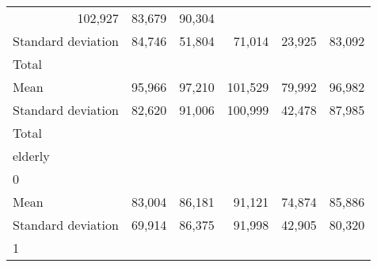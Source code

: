 \begin{tabular}{llllll}
  \multicolumn{1}{r}{102,927} &
  \multicolumn{1}{r}{83,679} &
  \multicolumn{1}{r}{90,304} \\
\multicolumn{1}{l}{\hspace{4em}Standard deviation} &
  \multicolumn{1}{|r}{84,746} &
  \multicolumn{1}{r}{51,804} &
  \multicolumn{1}{r}{71,014} &
  \multicolumn{1}{r}{23,925} &
  \multicolumn{1}{r}{83,092} \\
\multicolumn{1}{l}{\hspace{3em}Total} &
  \multicolumn{1}{|r}{} &
  \multicolumn{1}{r}{} &
  \multicolumn{1}{r}{} &
  \multicolumn{1}{r}{} &
  \multicolumn{1}{r}{} \\
\multicolumn{1}{l}{\hspace{4em}Mean} &
  \multicolumn{1}{|r}{95,966} &
  \multicolumn{1}{r}{97,210} &
  \multicolumn{1}{r}{101,529} &
  \multicolumn{1}{r}{79,992} &
  \multicolumn{1}{r}{96,982} \\
\multicolumn{1}{l}{\hspace{4em}Standard deviation} &
  \multicolumn{1}{|r}{82,620} &
  \multicolumn{1}{r}{91,006} &
  \multicolumn{1}{r}{100,999} &
  \multicolumn{1}{r}{42,478} &
  \multicolumn{1}{r}{87,985} \\
\multicolumn{1}{l}{\hspace{1em}Total} &
  \multicolumn{1}{|r}{} &
  \multicolumn{1}{r}{} &
  \multicolumn{1}{r}{} &
  \multicolumn{1}{r}{} &
  \multicolumn{1}{r}{} \\
\multicolumn{1}{l}{\hspace{2em}elderly} &
  \multicolumn{1}{|r}{} &
  \multicolumn{1}{r}{} &
  \multicolumn{1}{r}{} &
  \multicolumn{1}{r}{} &
  \multicolumn{1}{r}{} \\
\multicolumn{1}{l}{\hspace{3em}0} &
  \multicolumn{1}{|r}{} &
  \multicolumn{1}{r}{} &
  \multicolumn{1}{r}{} &
  \multicolumn{1}{r}{} &
  \multicolumn{1}{r}{} \\
\multicolumn{1}{l}{\hspace{4em}Mean} &
  \multicolumn{1}{|r}{83,004} &
  \multicolumn{1}{r}{86,181} &
  \multicolumn{1}{r}{91,121} &
  \multicolumn{1}{r}{74,874} &
  \multicolumn{1}{r}{85,886} \\
\multicolumn{1}{l}{\hspace{4em}Standard deviation} &
  \multicolumn{1}{|r}{69,914} &
  \multicolumn{1}{r}{86,375} &
  \multicolumn{1}{r}{91,998} &
  \multicolumn{1}{r}{42,905} &
  \multicolumn{1}{r}{80,320} \\
\multicolumn{1}{l}{\hspace{3em}1} &

\end{tabular}
